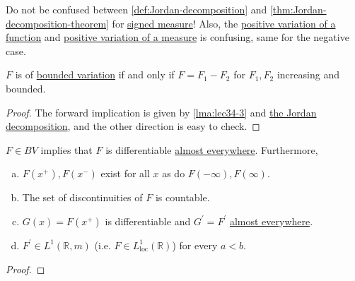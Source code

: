 \begin{note}
	Do not be confused between \autoref{def:Jordan-decomposition} and \autoref{thm:Jordan-decomposition-theorem}
	for \hyperref[def:signed-measure]{signed measure}! Also, the \hyperref[def:positive-variation-function]{positive variation of a function}
	and \hyperref[def:positive-variation-measure]{positive variation of a measure} is confusing, same for the negative case.
\end{note}

\begin{theorem}\label{thm:lec-34}
	\(F\) is of \hyperref[def:bounded-variation]{bounded variation} if and only if \(F = F_1 - F_2\) for \(F_1,F_2\) increasing and bounded.
\end{theorem}
\begin{proof}
	The forward implication is given by \autoref{lma:lec34-3} and \hyperref[def:Jordan-decomposition]{the Jordan decomposition}, and the other
	direction is easy to check.
\end{proof}

\begin{corollary}
	\(F \in BV\) implies that \(F\) is differentiable \hyperref[def:mu-almost-everywhere]{almost everywhere}. Furthermore,
	\begin{enumerate}[(a)]
		\item \(F(x^+),F(x^-)\) exist for all \(x\) as do \(F(-\infty),F(\infty)\).
		\item The set of discontinuities of \(F\) is countable.
		\item \(G(x) = F(x^+)\) is differentiable and \(G^\prime = F^\prime\) \hyperref[def:mu-almost-everywhere]{almost everywhere}.
		\item \(F^\prime \in L^1(\mathbb{R}, m)\) (i.e. \(F \in L^1_{\operatorname{loc}}(\mathbb{R})\)) for every \(a < b\).
	\end{enumerate}
\end{corollary}
\begin{proof}
\end{proof}